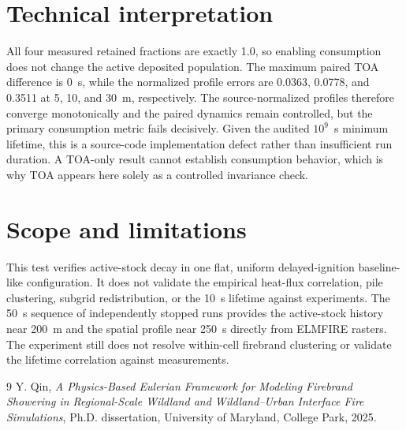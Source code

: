 \section{Technical interpretation}
All four measured retained fractions are exactly 1.0, so enabling consumption
does not change the active deposited population. The maximum paired TOA
difference is 0~s, while the normalized profile errors are 0.0363, 0.0778, and
0.3511 at 5, 10, and 30~m, respectively. The source-normalized profiles therefore
converge monotonically and the paired dynamics remain controlled, but the primary
consumption metric fails decisively. Given the audited \(10^9\)~s minimum
lifetime, this is a source-code implementation defect rather than insufficient
run duration. A TOA-only result cannot establish consumption behavior, which is
why TOA appears here solely as a controlled invariance check.

\section{Scope and limitations}
This test verifies active-stock decay in one flat, uniform delayed-ignition baseline-like
configuration. It does not validate the empirical heat-flux correlation, pile
clustering, subgrid redistribution, or the 10~s lifetime against experiments.
The 50~s sequence of independently stopped runs provides the active-stock history near 200~m and
the spatial profile near 250~s directly from ELMFIRE rasters. The experiment
still does not resolve within-cell firebrand clustering or validate the lifetime
correlation against measurements.

\begin{thebibliography}{9}
Y. Qin, \emph{A Physics-Based Eulerian Framework for Modeling Firebrand
Showering in Regional-Scale Wildland and Wildland--Urban Interface Fire
Simulations}, Ph.D. dissertation, University of Maryland, College Park, 2025.
\end{thebibliography}
